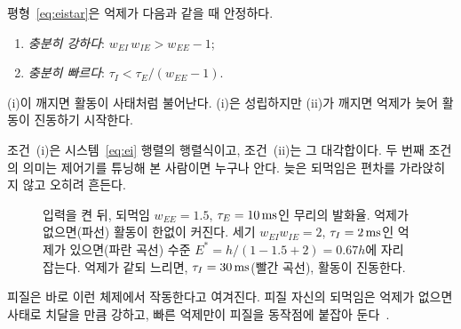 \begin{keyblock}
\begin{proposition}[안정 조건]
\label{prop:ei}
평형~\eqref{eq:eistar}은 억제가 다음과 같을 때 안정하다.
\begin{enumerate}
\item[(i)] \emph{충분히 강하다}: $w_{EI}\,w_{IE} > w_{EE}-1$;
\item[(ii)] \emph{충분히 빠르다}: $\tau_I < \tau_E/(w_{EE}-1)$.
\end{enumerate}
(i)이 깨지면 활동이 사태처럼 불어난다. (i)은 성립하지만 (ii)가 깨지면 억제가 늦어 활동이 진동하기 시작한다.
\end{proposition}
\end{keyblock}

조건~(i)은 시스템~\eqref{eq:ei} 행렬의 행렬식이고, 조건~(ii)는 그 대각합이다. 두 번째 조건의 의미는 제어기를 튜닝해 본 사람이면 누구나 안다. 늦은 되먹임은 편차를 가라앉히지 않고 오히려 흔든다.

\begin{figure}[t]
\centering
{}
\caption{입력을 켠 뒤, 되먹임 $w_{EE}=1.5$, $\tau_E=10\,\text{ms}$인  무리의 발화율. 억제가 없으면(파선) 활동이 한없이 커진다. 세기 $w_{EI}w_{IE}=2$, $\tau_I=2\,\text{ms}$인 억제가 있으면(파란 곡선) 수준 $E^*=h/(1-1.5+2)=0.67h$에 자리 잡는다. 억제가 같되 느리면, $\tau_I=30\,\text{ms}$(빨간 곡선), 활동이 진동한다.}
\label{fig:ei}
\end{figure}

피질은 바로 이런 체제에서 작동한다고 여겨진다. 피질 자신의 되먹임은 억제가 없으면 사태로 치달을 만큼 강하고, 빠른 억제만이 피질을 동작점에 붙잡아 둔다~\cite{Tsodyks1997isn}.

